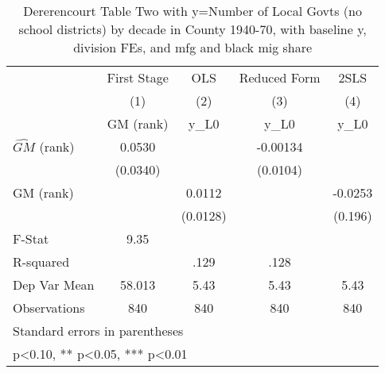 \begin{table}[htbp]\centering
\def\sym#1{\ifmmode^{#1}\else\(^{#1}\)\fi}
\caption{Dererencourt Table Two with y=Number of Local Govts (no school districts) by decade in County 1940-70, with baseline y, division FEs, and mfg and black mig share}
\begin{tabular}{l*{4}{c}}
\toprule
                    & First Stage   &         OLS   &Reduced Form   &        2SLS   \\
                    &\multicolumn{1}{c}{(1)}&\multicolumn{1}{c}{(2)}&\multicolumn{1}{c}{(3)}&\multicolumn{1}{c}{(4)}\\
                    &\multicolumn{1}{c}{GM  (rank)}&\multicolumn{1}{c}{y\_L0}&\multicolumn{1}{c}{y\_L0}&\multicolumn{1}{c}{y\_L0}\\
\midrule
$\hat{GM}$ (rank)   &      0.0530   &               &    -0.00134   &               \\
                    &    (0.0340)   &               &    (0.0104)   &               \\
\addlinespace
GM  (rank)          &               &      0.0112   &               &     -0.0253   \\
                    &               &    (0.0128)   &               &     (0.196)   \\
\midrule
F-Stat              &        9.35   &               &               &               \\
R-squared           &               &        .129   &        .128   &               \\
Dep Var Mean        &      58.013   &        5.43   &        5.43   &        5.43   \\
Observations        &         840   &         840   &         840   &         840   \\
\bottomrule
\multicolumn{5}{l}{\footnotesize Standard errors in parentheses}\\
\multicolumn{5}{l}{\footnotesize * p<0.10, ** p<0.05, *** p<0.01}\\
\end{tabular}
\end{table}
